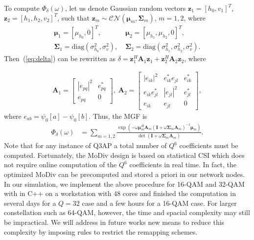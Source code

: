 \documentclass[journal,draftcls,onecolumn,12pt,twoside]{IEEEtran}
\begin{document}
To compute $\Phi_{\delta}(\omega)$, let us denote Gaussian random vectors
$\mathbf{z}_1 = [h_0, v_1]^T$, $\mathbf{z}_{2} = [h_1, h_2, v_2]^T$, such
that $\mathbf{z}_m\sim\mathcal{CN}(\bm{\mu}_m, \mathbf{\Sigma}_m)$, $m=1,2$,
where
\begin{align}
    \bm{\mu}_1 = [\mu_{h_0}, 0]^T,& \; \bm{\mu}_{2} = [\mu_{h_1}, \mu_{h_2},
    0]^T,
    \\
    \mathbf{\Sigma}_1 = \mbox{diag}\left(\sigma_{h_0}^2, \sigma_v^2\right), & \;
    \mathbf{\Sigma}_2 = \mbox{diag}\left(\sigma_{h_1}^2, \sigma_{h_2}^2,
    \sigma_v^2\right).
\end{align}
Then~(\ref{eq:delta}) can be rewritten as $\delta =
\mathbf{z}_1^H\mathbf{A}_1\mathbf{z}_1 +
\mathbf{z}_{2}^H\mathbf{A}_{2}\mathbf{z}_{2}$, where

\begin{align}
    \mathbf{A}_1 = \left[
        \begin{array}{cc}
            |e_{pq}|^2  & e_{pq}^* \\
            e_{pq} & 0
        \end{array}
    \right], \;
    \mathbf{A}_2 = \left[
        \begin{array}{ccc}
        |e_{ik}|^2 & e_{ik}^*e_{jl} & e_{ik}^*
        \\
        e_{ik}e_{jl}^* & |e_{jl}|^2 & e_{jl}^*
        \\
        e_{ik} & e_{jl} & 0
    \end{array}
    \right],
\end{align}
where $e_{ab} = \psi_0[a] - \psi_0[b]$. Thus, the MGF is
\begin{align}
    \Phi_{\delta}(\omega) & = \sum_{m=1,2}
    \frac{\exp(-\omega\bm{\mu}_m^H\mathbf{A}_m(\mathbf{I} +
    \omega\mathbf{\Sigma}_m\mathbf{A}_m)^{-1}\bm{\mu}_m)}{\det(\mathbf{I} +
    \omega\mathbf{\Sigma}_m\mathbf{A}_m)}.
\end{align}
Note that for any instance of Q3AP a total number of $Q^6$ coefficients must be
computed. Fortunately, the MoDiv design is based on statistical CSI which does
not require online computation of the $Q^6$ coefficients in real time. In fact,
the optimized MoDiv can be precomputed and stored a priori in our network nodes.
In our simulation, we implement the above procedure for 16-QAM and 32-QAM with
in C++ on a workstation with 48 cores and finished the computation in several
days for a $Q=32$ case and a few hours for a 16-QAM case. For larger
constellation such as 64-QAM, however, the time and spacial complexity may still
be impractical. We will address in future works new means to reduce this complexity by 
imposing rules to restrict the remapping schemes.
\end{document}
